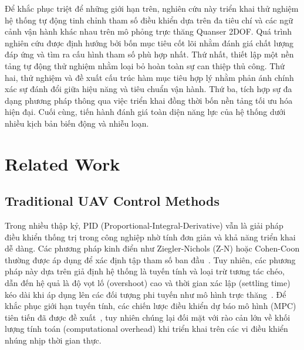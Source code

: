 \documentclass[conference, a4paper]{IEEEtran}
\begin{document}
Để khắc phục triệt để những giới hạn trên, nghiên cứu này triển khai thử nghiệm hệ thống tự động tinh chỉnh tham số điều khiển dựa trên đa tiêu chí và các ngữ cảnh vận hành khác nhau trên mô phỏng trực thăng Quanser 2DOF. Quá trình nghiên cứu được định hướng bởi bốn mục tiêu cốt lõi nhằm đánh giá chất lượng đáp ứng và tìm ra cấu hình tham số phù hợp nhất. Thứ nhất, thiết lập một nền tảng tự động thử nghiệm nhằm loại bỏ hoàn toàn sự can thiệp thủ công. Thứ hai, thử nghiệm và đề xuất cấu trúc hàm mục tiêu hợp lý nhằm phản ánh chính xác sự đánh đổi giữa hiệu năng và tiêu chuẩn vận hành. Thứ ba, tích hợp sự đa dạng phương pháp thông qua việc triển khai đồng thời bốn nền tảng tối ưu hóa hiện đại. Cuối cùng, tiến hành đánh giá toàn diện năng lực của hệ thống dưới nhiều kịch bản biến động và nhiễu loạn.

\section{Related Work}
\subsection{Traditional UAV Control Methods}
Trong nhiều thập kỷ, PID (Proportional-Integral-Derivative) vẫn là giải pháp điều khiển thống trị trong công nghiệp nhờ tính đơn giản và khả năng triển khai dễ dàng. Các phương pháp kinh điển như Ziegler-Nichols (Z-N) hoặc Cohen-Coon thường được áp dụng để xác định tập tham số ban đầu~\cite{ogata2010modern, franklin2015feedback}. Tuy nhiên, các phương pháp này dựa trên giả định hệ thống là tuyến tính và loại trừ tương tác chéo, dẫn đến hệ quả là độ vọt lố (overshoot) cao và thời gian xác lập (settling time) kéo dài khi áp dụng lên các đối tượng phi tuyến như mô hình trực thăng~\cite{zhu2025design, ashari2022altitude}. Để khắc phục giới hạn tuyến tính, các chiến lược điều khiển dự báo mô hình (MPC) tiên tiến đã được đề xuất~\cite{yildiz2025dual}, tuy nhiên chúng lại đối mặt với rào cản lớn về khối lượng tính toán (computational overhead) khi triển khai trên các vi điều khiển nhúng nhịp thời gian thực.
\end{document}
